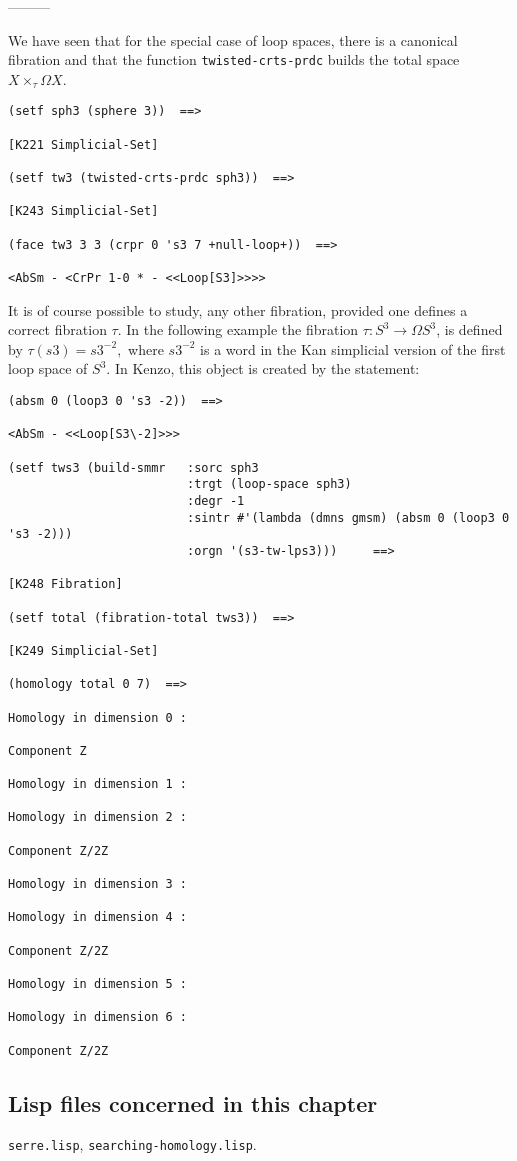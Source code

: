 \begin{center}
---------
\end{center}
We have seen that for the special case of loop spaces, there is a
canonical fibration and that the function {\tt twisted-crts-prdc}
builds the total space $X \times_\tau \Omega X$.
{\footnotesize\begin{verbatim}
(setf sph3 (sphere 3))  ==>

[K221 Simplicial-Set]

(setf tw3 (twisted-crts-prdc sph3))  ==>

[K243 Simplicial-Set]

(face tw3 3 3 (crpr 0 's3 7 +null-loop+))  ==>

<AbSm - <CrPr 1-0 * - <<Loop[S3]>>>>
\end{verbatim}}
It is of course possible to study, any other fibration, provided one
defines a correct fibration $\tau$. In the following example
the fibration $\tau: S^3 \longrightarrow \Omega S^3$, is defined
by 
$\tau(s3)= s3^{-2},$ where $s3^{-2}$ is a word in the Kan simplicial version
of the first loop space of $S^3$. In Kenzo, this object is created by the
statement:
{\footnotesize\begin{verbatim}
(absm 0 (loop3 0 's3 -2))  ==>

<AbSm - <<Loop[S3\-2]>>>

(setf tws3 (build-smmr   :sorc sph3
                         :trgt (loop-space sph3)
                         :degr -1
                         :sintr #'(lambda (dmns gmsm) (absm 0 (loop3 0 's3 -2)))
                         :orgn '(s3-tw-lps3)))     ==>

[K248 Fibration]

(setf total (fibration-total tws3))  ==>

[K249 Simplicial-Set]

(homology total 0 7)  ==>

Homology in dimension 0 :

Component Z

Homology in dimension 1 :

Homology in dimension 2 :

Component Z/2Z

Homology in dimension 3 :

Homology in dimension 4 :

Component Z/2Z

Homology in dimension 5 :

Homology in dimension 6 :

Component Z/2Z
\end{verbatim}}
\newpage

\subsection* {Lisp files concerned in this chapter}

{\tt serre.lisp}, {\tt searching-homology.lisp}.
